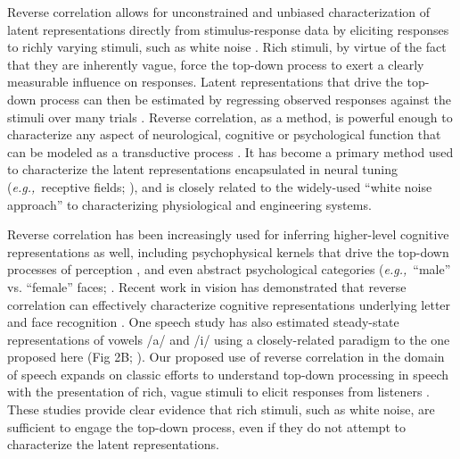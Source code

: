 \documentclass[11pt, notitlepage]{article} %
\def\eg{{\emph{e.g.,}}~}
\begin{document}
Reverse correlation allows for unconstrained and unbiased
characterization of latent representations directly from stimulus-response data by eliciting responses to
richly varying stimuli, such as white noise \cite{marmarelisWhiteNoiseMethodSystem1978, nishimotoReceptiveFieldProperties2006}.
Rich stimuli, by virtue of the fact that they are inherently vague, force the top-down process to exert a clearly
measurable influence on responses. Latent representations that drive the top-down process can then be
estimated by regressing observed responses against the stimuli over many trials \cite{mineaultImprovedClassificationImages2009}.
Reverse correlation, as a method, is powerful enough to characterize any aspect of neurological,
cognitive or psychological function that can be modeled as a transductive process \cite{ringachReverseCorrelationNeurophysiology2004}.
It has become a primary method used to characterize the latent representations encapsulated in neural tuning
(\eg receptive fields; \cite{ringachReverseCorrelationNeurophysiology2004}), and is closely related to the widely-used ``white noise approach'' to
characterizing physiological \cite{marmarelisWhiteNoiseMethodSystem1978} and engineering \cite{ljungMeasureLackFit1978} systems. 

Reverse correlation has been increasingly used for inferring higher-level cognitive representations as well,
including psychophysical kernels that drive the top-down processes of perception
\cite{ahumadaStimulusFeaturesSignal1971, neriReceptivePerceptiveFields2006,gosselinSuperstitiousPerceptionsReveal2003,smithMeasuringInternalRepresentations2012}, 
and even abstract psychological
categories (\eg ``male'' vs. ``female'' faces; \cite{brinkmanVisualisingMentalRepresentations2017,manginiMakingIneffableExplicit2004,ponsotCrackingSocialCode2018}.
Recent work in vision has demonstrated that
reverse correlation can effectively characterize cognitive representations underlying letter and face
recognition \cite{gosselinSuperstitiousPerceptionsReveal2003,liuSeeingJesusToast2014}.
One speech study has also estimated steady-state representations of vowels /a/
and /i/ using a closely-related paradigm to the one proposed here (Fig 2B; \cite{brimijoinInternalRepresentationVowel2013}). Our
proposed use of reverse correlation in the domain of speech expands on classic efforts to understand
top-down processing in speech with the presentation of rich, vague stimuli to elicit responses from
listeners \cite{warrenAuditoryIllusionsConfusions1970,vokeySubliminalMessagesDevil1985}.
These studies provide clear evidence that rich
stimuli, such as white noise, are sufficient to engage the top-down process, even if they do not attempt to
characterize the latent representations.
\end{document}
